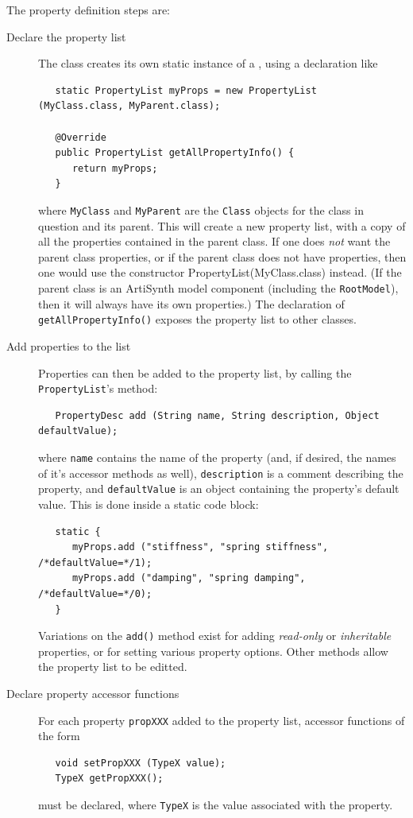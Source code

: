 The property definition steps are:

\begin{description}

\item[Declare the property list]\mbox{}

The class creates its own static instance of a
, using a declaration like
%
\begin{lstlisting}
   static PropertyList myProps = new PropertyList (MyClass.class, MyParent.class);

   @Override   
   public PropertyList getAllPropertyInfo() {
      return myProps;
   }  
\end{lstlisting}
%
where {\tt MyClass} and {\tt MyParent} are the {\tt Class} objects for
the class in question and its parent. This will create a new property
list, with a copy of all the properties contained in the parent class.
If one does {\it not} want the parent class properties, or if the
parent class does not have properties, then one would use the
constructor
%
{PropertyList(MyClass.class)} instead. (If the parent class is an
ArtiSynth model component (including the {\tt RootModel}), then it
will always have its own properties.)  The declaration of {\tt
getAllPropertyInfo()} exposes the property list to other classes.

\item[Add properties to the list]\mbox{}

Properties can then be added to the property list, by calling the {\tt
PropertyList}'s
method:
%
\begin{lstlisting}
   PropertyDesc add (String name, String description, Object defaultValue);
\end{lstlisting}
%
where {\tt name} contains the name of the property (and, if desired,
the names of it's accessor methods as well), {\tt description}
is a comment describing the property, and {\tt defaultValue} is
an object containing the property's default value.
This is done inside a static code block:
%
\begin{lstlisting}
   static {
      myProps.add ("stiffness", "spring stiffness", /*defaultValue=*/1);
      myProps.add ("damping", "spring damping", /*defaultValue=*/0);
   }
\end{lstlisting}
%
Variations on the {\tt add()} method exist for adding {\it read-only}
or {\it inheritable} properties, or for setting various property
options. Other methods allow the property list to be editted.

\item[Declare property accessor functions]\mbox{}

For each property {\tt propXXX} added to the property list, accessor functions of
the form
%
\begin{lstlisting}
   void setPropXXX (TypeX value);
   TypeX getPropXXX();
\end{lstlisting}
%
must be declared, where {\tt TypeX} is the value associated with the
property. 

\end{description}

